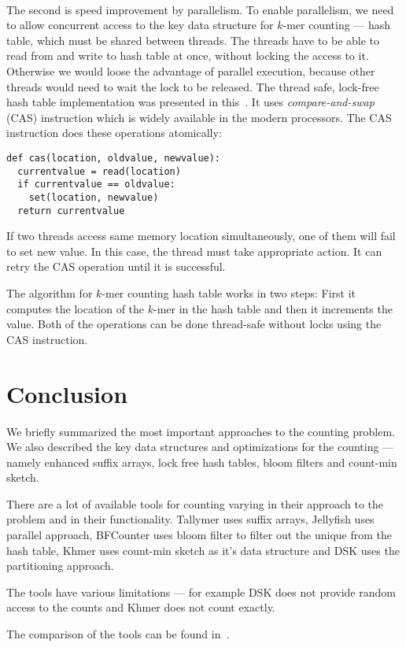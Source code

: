 \paragraph{} The second is speed improvement by parallelism. To enable parallelism, we need to allow concurrent access to the key data structure for $k$-mer counting --- hash table, which must be shared between threads. The threads have to be able to read from and write to hash table at once, without locking the access to it. Otherwise we would loose the advantage of parallel execution, because other threads would need to wait the lock to be released. The thread safe, lock-free hash table implementation was presented in this~\cite{jellyfish}. It uses \emph{compare-and-swap} (CAS) instruction which is widely available in the modern processors. The CAS instruction does these operations atomically:
\begin{lstlisting}
def cas(location, oldvalue, newvalue):
  currentvalue = read(location)
  if currentvalue == oldvalue:
    set(location, newvalue)
  return currentvalue
\end{lstlisting}
If two threads access same memory location simultaneously, one of them will fail to set new value. In this case, the thread must take appropriate action.
It can retry the CAS operation until it is successful.

The algorithm for $k$-mer counting hash table works in two steps:
First it computes the location of the $k$-mer in the hash table and then it increments the value. Both of the operations can be done thread-safe without locks using the CAS instruction.

\section{Conclusion}

We briefly summarized the most important approaches to the \kmer counting problem. We also described the key data structures and optimizations for the \kmer counting --- namely enhanced suffix arrays, lock free hash tables, bloom filters and count-min sketch.

There are a lot of available tools for \kmer counting varying in their approach to the problem and in their functionality. Tallymer uses suffix arrays, Jellyfish uses parallel approach, BFCounter uses bloom filter to filter out the unique \kmers from the hash table, Khmer uses count-min sketch as it's data structure and DSK uses the partitioning approach.

The tools have various limitations --- for example DSK does not provide random access to the counts and Khmer does not count \kmers exactly.

The comparison of the tools can be found in~\cite{khmer}.
